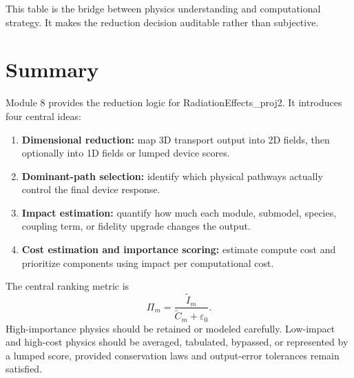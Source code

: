 \documentclass[11pt]{article}
\begin{document}
This table is the bridge between physics understanding and computational strategy. It makes the reduction decision auditable rather than subjective.

\section{Summary}
Module 8 provides the reduction logic for RadiationEffects\_proj2. It introduces four central ideas:
\begin{enumerate}[label=\arabic*.]
    \item \textbf{Dimensional reduction:} map 3D transport output into 2D fields, then optionally into 1D fields or lumped device scores.
    \item \textbf{Dominant-path selection:} identify which physical pathways actually control the final device response.
    \item \textbf{Impact estimation:} quantify how much each module, submodel, species, coupling term, or fidelity upgrade changes the output.
    \item \textbf{Cost estimation and importance scoring:} estimate compute cost and prioritize components using impact per computational cost.
\end{enumerate}

The central ranking metric is
\begin{equation}
    \boxed{
    \Pi_m
    =
    \frac{\widetilde{I}_m}{\widetilde{C}_m+\varepsilon_0}.
    }
\end{equation}
High-importance physics should be retained or modeled carefully. Low-impact and high-cost physics should be averaged, tabulated, bypassed, or represented by a lumped score, provided conservation laws and output-error tolerances remain satisfied.
\end{document}
